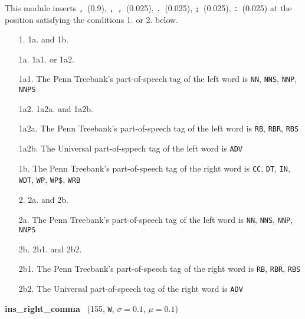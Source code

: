 \documentclass[11pt]{article}
\newenvironment{desc}{%
	\list{}{%
		\parsep 0.25em
		\topsep 0.25em
		\leftmargin 1em
		\rightmargin 0em
	}
	\item\relax
	\sloppy
}{%
	\endlist
}
\newcommand{\attr}[4]{%
	(#1, \texttt{#2}, $\sigma=#3$, $\mu=#4$)
}
\begin{document}
\begin{desc}
	This module inserts
	\texttt{,}~(0.9),
	\texttt{,{~},}~(0.025),
	\texttt{.}~(0.025),
	\texttt{;}~(0.025),
	\texttt{:}~(0.025)
	at the position satisfying the conditions 1. or 2. below.

	\begin{itemize}
		\setlength{\itemsep}{0em}
		\setlength{\parskip}{0em}
		\item[1.] 1a. and 1b.
		\item[1a.] 1a1. or 1a2.
		\item[1a1.] The Penn Treebank's part-of-speech tag of the left word is
			\texttt{NN},
			\texttt{NNS},
			\texttt{NNP},
			\texttt{NNPS}
		\item[1a2.] 1a2a. and 1a2b.
		\item[1a2a.] The Penn Treebank's part-of-speech tag of the left word is
			\texttt{RB},
			\texttt{RBR},
			\texttt{RBS}
		\item[1a2b.] The Universal part-of-sppech tag of the left word is \texttt{ADV}
		\item[1b.] The Penn Treebank's part-of-speech tag of the right word is
			\texttt{CC},
			\texttt{DT},
			\texttt{IN},
			\texttt{WDT},
			\texttt{WP},
			\texttt{WP\$},
			\texttt{WRB}
		\item[2.] 2a. and 2b.
		\item[2a.] The Penn Treebank's part-of-speech tag of the left word is
			\texttt{NN},
			\texttt{NNS},
			\texttt{NNP},
			\texttt{NNPS}
		\item[2b.] 2b1. and 2b2.
		\item[2b1.] The Penn Treebank's part-of-speech tag of the right word is
			\texttt{RB},
			\texttt{RBR},
			\texttt{RBS}
		\item[2b2.] The Universal part-of-speech tag of the right word is \texttt{ADV}
	\end{itemize}
\end{desc}

\noindent
\textbf{ins\_right\_comma}~\attr{155}{W}{0.1}{0.1}
\end{document}
